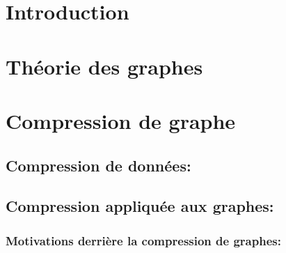 \documentclass[a4paper,oneside,12pt]{report}
\theoremstyle{definition}
\begin{document}







\tableofcontents
\newpage

\listoffigures
{}
\cleardoublepage


\listoftables
{}
\cleardoublepage



\chapter{Introduction} 


	\chapter{ Théorie des graphes}
	  
	

	\chapter{Compression de graphe}
	
		\section{Compression de données: }
			
			
		
		\section{Compression appliquée aux graphes:}
	
			\subsection{Motivations derrière la compression de graphes: }
	
\end{document}

